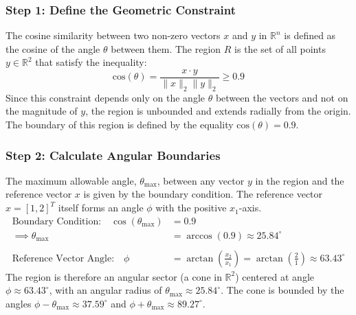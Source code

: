 \documentclass{article}
\begin{document}
\subsubsection*{Step 1: Define the Geometric Constraint}
\parbox{\textwidth}{
The cosine similarity between two non-zero vectors $x$ and $y$ in $\mathbb{R}^n$ is defined as the cosine of the angle $\theta$ between them. The region $R$ is the set of all points $y \in \mathbb{R}^2$ that satisfy the inequality:
$$ \text{cos}(\theta) = \frac{x \cdot y}{\|x\|_2 \|y\|_2} \geq 0.9 $$
Since this constraint depends only on the angle $\theta$ between the vectors and not on the magnitude of $y$, the region is unbounded and extends radially from the origin. The boundary of this region is defined by the equality $\text{cos}(\theta) = 0.9$.
}

\subsubsection*{Step 2: Calculate Angular Boundaries}
The maximum allowable angle, $\theta_{\text{max}}$, between any vector $y$ in the region and the reference vector $x$ is given by the boundary condition. The reference vector $x = [1, 2]^T$ itself forms an angle $\phi$ with the positive $x_1$-axis.
\begin{align*}
    \text{Boundary Condition:}\quad \cos(\theta_{\text{max}}) &= 0.9 \\
    \implies \theta_{\text{max}} &= \arccos(0.9) \approx 25.84^\circ \\
    \\
    \text{Reference Vector Angle:}\quad \phi &= \arctan\left(\frac{x_2}{x_1}\right) = \arctan\left(\frac{2}{1}\right) \approx 63.43^\circ
\end{align*}
The region is therefore an angular sector (a cone in $\mathbb{R}^2$) centered at angle $\phi \approx 63.43^\circ$, with an angular radius of $\theta_{\text{max}} \approx 25.84^\circ$. The cone is bounded by the angles $\phi - \theta_{\text{max}} \approx 37.59^\circ$ and $\phi + \theta_{\text{max}} \approx 89.27^\circ$.
\end{document}
